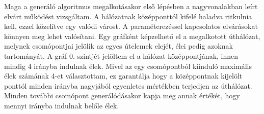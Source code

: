﻿
Maga a generáló algoritmus megalkotásakor első lépésben a nagyvonalakban leírt elvárt működést vizsgáltam. A hálózatnak középponttól kifelé haladva ritkulnia kell, ezzel közelítve egy 
valódi várost. A paraméterezéssel kapcsolatos elvárásokat könnyen meg lehet valósítani. Egy gráfként képzelhető el a megalkotott úthálózat, melynek csomópontjai jelölik az egyes útelemek 
elejét, élei pedig azoknak tartományát. A gráf 0. szintjét jelöltem el a hálózat középpontjának, innen mindig 4 irányba indulnak élek. Mivel az egy csomópontból kiinduló maximális élek számának 4-et választottam,
 ez garantálja hogy a középpontnak kijelölt ponttól minden irányba nagyjából egyenletes mértékben terjedjen az úthálózat. Minden további csomópont generálódásakor kapja meg 
annak értékét, hogy mennyi irányba indulnak belőle élek. 
